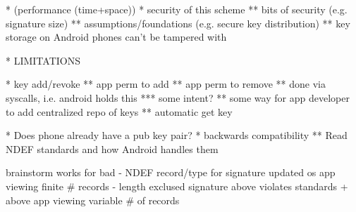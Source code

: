 \documentclass[12pt]{article}
\begin{document}
* (performance (time+space))
* security of this scheme
** bits of security (e.g. signature size)
** assumptions/foundations (e.g. secure key distribution)
** key storage on Android phones can't be tampered with

* LIMITATIONS

* key add/revoke
** app perm to add
** app perm to remove
** done via syscalls, i.e. android holds this
*** some intent?
** some way for app developer to add centralized repo of keys
** automatic get key

* Does phone already have a pub key pair?
* backwards compatibility
** Read NDEF standards and how Android handles them

brainstorm                         works for                           bad
- NDEF record/type for signature   updated os
                                   app viewing finite \# records
- length exclused signature        above                               violates standards
  + above                          app viewing variable \# of records   

\end{document}
